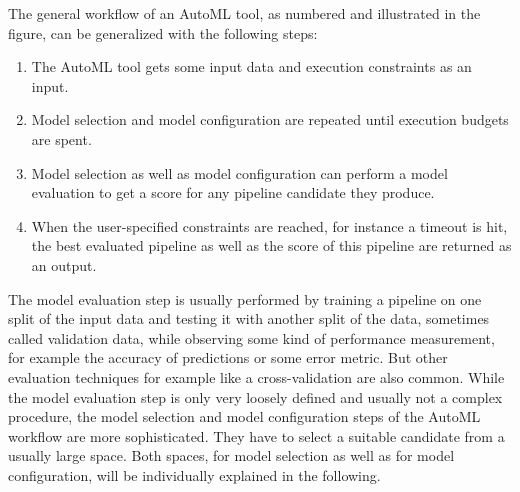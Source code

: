 The general workflow of an AutoML tool, as numbered and illustrated in the figure, can be generalized with the following steps:
\begin{enumerate}
    \item The AutoML tool gets some input data and execution constraints as an input.
    \item Model selection and model configuration are repeated until execution budgets are spent.
    \item Model selection as well as model configuration can perform a model evaluation to get a score for any pipeline candidate they produce.
    \item When the user-specified constraints are reached, for instance a timeout is hit, the best evaluated pipeline as well as the score of this pipeline are returned as an output.
\end{enumerate}
The model evaluation step is usually performed by training a pipeline on one split of the input data and testing it with another split of the data, sometimes called validation data, while observing some kind of performance measurement, for example the accuracy of predictions or some error metric.
But other evaluation techniques for example like a cross-validation are also common.\newline
While the model evaluation step is only very loosely defined and usually not a complex procedure, the model selection and model configuration steps of the AutoML workflow are more sophisticated.
They have to select a suitable candidate from a usually large space. 
Both spaces, for model selection as well as for model configuration, will be individually explained in the following.

